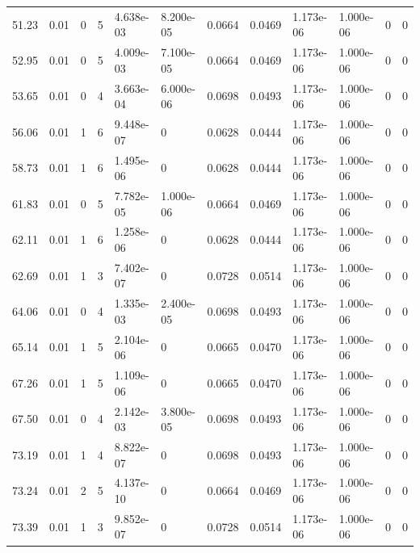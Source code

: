 \documentclass[preview]{standalone}
\begin{document}
{{\begin{tabular}{L{1.2cm}C{1.2cm} C{0.3cm}C{0.5cm} C{1.4cm}C{1.4cm} C{1.4cm}C{1.4cm} C{1.6cm}C{1.6cm} C{1.6cm}C{1.6cm}}
  51.23  &  0.01  & 0     &  5 &  4.638e-03  & 8.200e-05  &  0.0664&   0.0469& 1.173e-06 & 1.000e-06   &  0 & 0  \\ 
  52.95  &  0.01  & 0     &  5 &  4.009e-03  & 7.100e-05  &  0.0664&   0.0469& 1.173e-06 & 1.000e-06   &  0 & 0  \\ 
  53.65  &  0.01  & 0     &  4 &  3.663e-04  & 6.000e-06  &  0.0698&   0.0493& 1.173e-06 & 1.000e-06   &  0 & 0  \\ 
  56.06  &  0.01  & 1     &  6 &  9.448e-07  & 0  &  0.0628&   0.0444& 1.173e-06 & 1.000e-06   &  0 & 0  \\ 
  58.73  &  0.01  & 1     &  6 &  1.495e-06  & 0  &  0.0628&   0.0444& 1.173e-06 & 1.000e-06   &  0 & 0  \\ 
  61.83  &  0.01  & 0     &  5 &  7.782e-05  & 1.000e-06  &  0.0664&   0.0469& 1.173e-06 & 1.000e-06   &  0 & 0  \\ 
  62.11  &  0.01  & 1     &  6 &  1.258e-06  & 0  &  0.0628&   0.0444& 1.173e-06 & 1.000e-06   &  0 & 0  \\ 
  62.69  &  0.01  & 1     &  3 &  7.402e-07  & 0  &  0.0728&   0.0514& 1.173e-06 & 1.000e-06   &  0 & 0  \\ 
  64.06  &  0.01  & 0     &  4 &  1.335e-03  & 2.400e-05  &  0.0698&   0.0493& 1.173e-06 & 1.000e-06   &  0 & 0  \\ 
  65.14  &  0.01  & 1     &  5 &  2.104e-06  & 0  &  0.0665&   0.0470& 1.173e-06 & 1.000e-06   &  0 & 0  \\ 
  67.26  &  0.01  & 1     &  5 &  1.109e-06  & 0  &  0.0665&   0.0470& 1.173e-06 & 1.000e-06   &  0 & 0  \\ 
  67.50  &  0.01  & 0     &  4 &  2.142e-03  & 3.800e-05  &  0.0698&   0.0493& 1.173e-06 & 1.000e-06   &  0 & 0  \\ 
  73.19  &  0.01  & 1     &  4 &  8.822e-07  & 0  &  0.0698&   0.0493& 1.173e-06 & 1.000e-06   &  0 & 0  \\ 
  73.24  &  0.01  & 2     &  5 &  4.137e-10  & 0  &  0.0664&   0.0469& 1.173e-06 & 1.000e-06   &  0 & 0  \\ 
  73.39  &  0.01  & 1     &  3 &  9.852e-07  & 0  &  0.0728&   0.0514& 1.173e-06 & 1.000e-06   &  0 & 0  \\ 
\hline 
\end{tabular} 

}}
\end{document}
